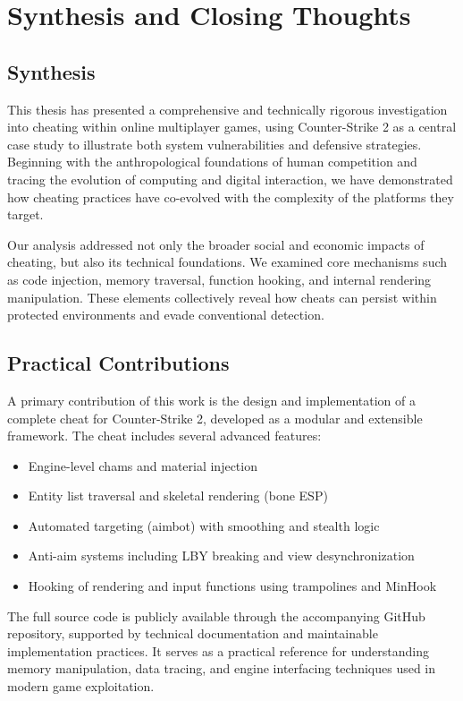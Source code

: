 \chapter{Synthesis and Closing Thoughts}

\section*{Synthesis}

This thesis has presented a comprehensive and technically rigorous investigation into cheating within online multiplayer games, using Counter-Strike 2 as a central case study to illustrate both system vulnerabilities and defensive strategies. Beginning with the anthropological foundations of human competition and tracing the evolution of computing and digital interaction, we have demonstrated how cheating practices have co-evolved with the complexity of the platforms they target.

Our analysis addressed not only the broader social and economic impacts of cheating, but also its technical foundations. We examined core mechanisms such as code injection, memory traversal, function hooking, and internal rendering manipulation. These elements collectively reveal how cheats can persist within protected environments and evade conventional detection.

\section*{Practical Contributions}

A primary contribution of this work is the design and implementation of a complete cheat for Counter-Strike 2, developed as a modular and extensible framework. The cheat includes several advanced features:

\begin{itemize}
  \item Engine-level chams and material injection
  \item Entity list traversal and skeletal rendering (bone ESP)
  \item Automated targeting (aimbot) with smoothing and stealth logic
  \item Anti-aim systems including LBY breaking and view desynchronization
  \item Hooking of rendering and input functions using trampolines and MinHook
\end{itemize}

The full source code is publicly available through the accompanying GitHub repository, supported by technical documentation and maintainable implementation practices. It serves as a practical reference for understanding memory manipulation, data tracing, and engine interfacing techniques used in modern game exploitation.

